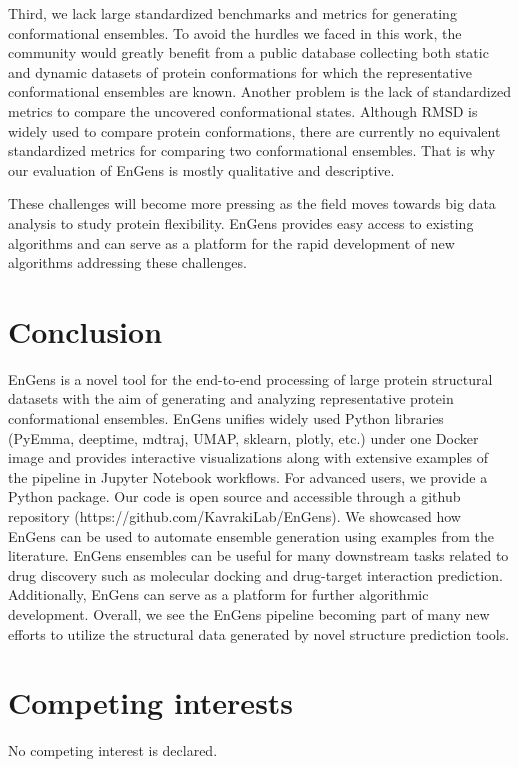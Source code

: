 \documentclass[unnumsec,webpdf,contemporary,large,numsquare]{oup-authoring-template}%
\theoremstyle{thmstyleone}%
\theoremstyle{thmstyletwo}%
\theoremstyle{thmstylethree}%
\begin{document}
Third, we lack large standardized benchmarks and metrics for generating conformational ensembles. To avoid the hurdles we faced in this work, the community would greatly benefit from a public database collecting both static and dynamic datasets of protein conformations for which the representative conformational ensembles are known.  Another problem is the lack of standardized metrics to compare the uncovered conformational states. Although RMSD is widely used to compare protein conformations, there are currently no equivalent standardized metrics for comparing two conformational ensembles. That is why our evaluation of EnGens is mostly qualitative and descriptive. 

These challenges will become more pressing as the field moves towards big data analysis to study protein flexibility. EnGens provides easy access to existing algorithms and can serve as a platform for the rapid development of new algorithms addressing these challenges.

\section{Conclusion}

EnGens is a novel tool for the end-to-end processing of large protein structural datasets with the aim of generating and analyzing representative protein conformational ensembles. EnGens unifies widely used Python libraries (PyEmma, deeptime, mdtraj, UMAP, sklearn, plotly, etc.) under one Docker image and provides interactive visualizations along with extensive examples of the pipeline in Jupyter Notebook workflows. For advanced users, we provide a Python package. Our code is open source and accessible through a github repository (https://github.com/KavrakiLab/EnGens). We showcased how EnGens can be used to automate ensemble generation using examples from the literature.  EnGens ensembles can be useful for many downstream tasks related to drug discovery such as molecular docking and drug-target interaction prediction. Additionally, EnGens can serve as a platform for further algorithmic development. Overall, we see the EnGens pipeline becoming part of many new efforts to utilize the structural data generated by novel structure prediction tools. 


\section{Competing interests}
No competing interest is declared.
\end{document}
